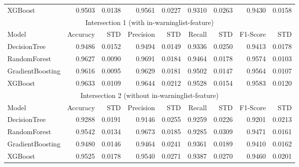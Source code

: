 \documentclass[11pt]{article}
\begin{document}
\begin{tabular}{l|rr|rr|rr|rr}
	XGBoost  & 0.9503 & 0.0138 & 0.9561 & 0.0227 & 0.9310 & 0.0263 & 0.9430 & 0.0158 \\
	\multicolumn{9}{c}{Intersection 1 (with in-warninglist-feature)}\\
	Model & Accuracy & STD & Precision & STD & Recall & STD & F1-Score & STD \\
	\hline
	DecisionTree & 0.9486 & 0.0152 & 0.9494 & 0.0149 & 0.9336 & 0.0250 & 0.9413 & 0.0178 \\
	RandomForest & 0.9627 & 0.0090 & 0.9691 & 0.0184 & 0.9464 & 0.0178 & 0.9574 & 0.0103 \\
	GradientBoosting & 0.9616 & 0.0095 & 0.9629 & 0.0181 & 0.9502 & 0.0147 & 0.9564 & 0.0107 \\
	XGBoost & 0.9633 & 0.0109 & 0.9644 & 0.0212 & 0.9528 & 0.0154 & 0.9583 & 0.0120 \\
	\multicolumn{9}{c}{Intersection 2 (without in-warninglist-feature)}\\
	Model & Accuracy & STD & Precision & STD & Recall & STD & F1-Score & STD \\
	\hline
	DecisionTree & 0.9288 & 0.0191 & 0.9146 & 0.0255 & 0.9259 & 0.0226 & 0.9201 & 0.0213 \\
	RandomForest & 0.9542 & 0.0134 & 0.9673 & 0.0185 & 0.9285 & 0.0309 & 0.9471 & 0.0161 \\
	GradientBoosting & 0.9480 & 0.0146 & 0.9464 & 0.0241 & 0.9361 & 0.0189 & 0.9410 & 0.0162 \\
	XGBoost & 0.9525 & 0.0178 & 0.9540 & 0.0271 & 0.9387 & 0.0270 & 0.9460 & 0.0201 \\
\end{tabular}
\end{document}
